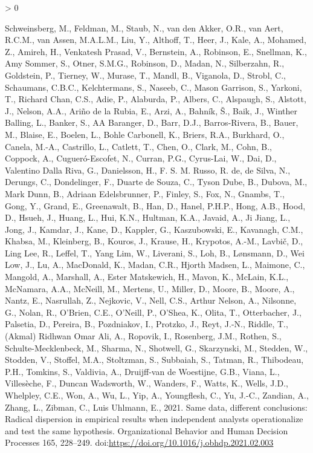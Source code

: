 \documentclass[]{elsarticle} %
\newlength{\cslhangindent}
\newenvironment{CSLReferences}[2] %
 {%
  \setlength{\parindent}{0pt}
  \ifodd #1 \everypar{\setlength{\hangindent}{\cslhangindent}}\ignorespaces\fi
  \ifnum #2 > 0
  \setlength{\parskip}{#2\baselineskip}
  \fi
 }%
 {}
\begin{document}
\begin{CSLReferences}{1}{0}
\leavevmode\hypertarget{ref-Schweinsberg2021same}{}%
Schweinsberg, M., Feldman, M., Staub, N., van den Akker, O.R., van Aert,
R.C.M., van Assen, M.A.L.M., Liu, Y., Althoff, T., Heer, J., Kale, A.,
Mohamed, Z., Amireh, H., Venkatesh Prasad, V., Bernstein, A., Robinson,
E., Snellman, K., Amy Sommer, S., Otner, S.M.G., Robinson, D., Madan,
N., Silberzahn, R., Goldstein, P., Tierney, W., Murase, T., Mandl, B.,
Viganola, D., Strobl, C., Schaumans, C.B.C., Kelchtermans, S., Naseeb,
C., Mason Garrison, S., Yarkoni, T., Richard Chan, C.S., Adie, P.,
Alaburda, P., Albers, C., Alspaugh, S., Alstott, J., Nelson, A.A., Ariño
de la Rubia, E., Arzi, A., Bahník, Š., Baik, J., Winther Balling, L.,
Banker, S., AA Baranger, D., Barr, D.J., Barros-Rivera, B., Bauer, M.,
Blaise, E., Boelen, L., Bohle Carbonell, K., Briers, R.A., Burkhard, O.,
Canela, M.-A., Castrillo, L., Catlett, T., Chen, O., Clark, M., Cohn,
B., Coppock, A., Cugueró-Escofet, N., Curran, P.G., Cyrus-Lai, W., Dai,
D., Valentino Dalla Riva, G., Danielsson, H., F. S. M. Russo, R. de, de
Silva, N., Derungs, C., Dondelinger, F., Duarte de Souza, C., Tyson
Dube, B., Dubova, M., Mark Dunn, B., Adriaan Edelsbrunner, P., Finley,
S., Fox, N., Gnambs, T., Gong, Y., Grand, E., Greenawalt, B., Han, D.,
Hanel, P.H.P., Hong, A.B., Hood, D., Hsueh, J., Huang, L., Hui, K.N.,
Hultman, K.A., Javaid, A., Ji Jiang, L., Jong, J., Kamdar, J., Kane, D.,
Kappler, G., Kaszubowski, E., Kavanagh, C.M., Khabsa, M., Kleinberg, B.,
Kouros, J., Krause, H., Krypotos, A.-M., Lavbič, D., Ling Lee, R.,
Leffel, T., Yang Lim, W., Liverani, S., Loh, B., Lønsmann, D., Wei Low,
J., Lu, A., MacDonald, K., Madan, C.R., Hjorth Madsen, L., Maimone, C.,
Mangold, A., Marshall, A., Ester Matskewich, H., Mavon, K., McLain,
K.L., McNamara, A.A., McNeill, M., Mertens, U., Miller, D., Moore, B.,
Moore, A., Nantz, E., Nasrullah, Z., Nejkovic, V., Nell, C.S., Arthur
Nelson, A., Nilsonne, G., Nolan, R., O'Brien, C.E., O'Neill, P., O'Shea,
K., Olita, T., Otterbacher, J., Palsetia, D., Pereira, B., Pozdniakov,
I., Protzko, J., Reyt, J.-N., Riddle, T., (Akmal) Ridhwan Omar Ali, A.,
Ropovik, I., Rosenberg, J.M., Rothen, S., Schulte-Mecklenbeck, M.,
Sharma, N., Shotwell, G., Skarzynski, M., Stedden, W., Stodden, V.,
Stoffel, M.A., Stoltzman, S., Subbaiah, S., Tatman, R., Thibodeau, P.H.,
Tomkins, S., Valdivia, A., Druijff-van de Woestijne, G.B., Viana, L.,
Villesèche, F., Duncan Wadsworth, W., Wanders, F., Watts, K., Wells,
J.D., Whelpley, C.E., Won, A., Wu, L., Yip, A., Youngflesh, C., Yu,
J.-C., Zandian, A., Zhang, L., Zibman, C., Luis Uhlmann, E., 2021. Same
data, different conclusions: Radical dispersion in empirical results
when independent analysts operationalize and test the same hypothesis.
Organizational Behavior and Human Decision Processes 165, 228--249.
doi:\url{https://doi.org/10.1016/j.obhdp.2021.02.003}


\end{CSLReferences}
\end{document}

